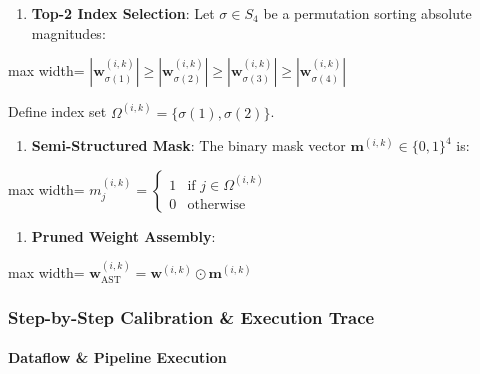 \begin{enumerate}
\item \textbf{Top-2 Index Selection}:
Let $\sigma \in S_4$ be a permutation sorting absolute magnitudes:
\end{enumerate}
\begin{center}
\begin{adjustbox}{max width=\columnwidth}
$\displaystyle
\left| \mathbf{w}_{\sigma(1)}^{(i, k)} \right| \ge \left| \mathbf{w}_{\sigma(2)}^{(i, k)} \right| \ge \left| \mathbf{w}_{\sigma(3)}^{(i, k)} \right| \ge \left| \mathbf{w}_{\sigma(4)}^{(i, k)} \right|
$
\end{adjustbox}
\end{center}
Define index set $\Omega^{(i, k)} = \{ \sigma(1), \sigma(2) \}$.

\begin{enumerate}
\item \textbf{Semi-Structured Mask}:
The binary mask vector $\mathbf{m}^{(i, k)} \in \{0, 1\}^4$ is:
\end{enumerate}
\begin{center}
\begin{adjustbox}{max width=\columnwidth}
$\displaystyle
m_j^{(i, k)} = \begin{cases} 1 & \text{if } j \in \Omega^{(i, k)} \\ 0 & \text{otherwise} \end{cases}
$
\end{adjustbox}
\end{center}

\begin{enumerate}
\item \textbf{Pruned Weight Assembly}:
\end{enumerate}
\begin{center}
\begin{adjustbox}{max width=\columnwidth}
$\displaystyle
\mathbf{w}_{\text{AST}}^{(i, k)} = \mathbf{w}^{(i, k)} \odot \mathbf{m}^{(i, k)}
$
\end{adjustbox}
\end{center}


\subsubsection*{Step-by-Step Calibration \& Execution Trace}

\paragraph{Dataflow \& Pipeline Execution}

